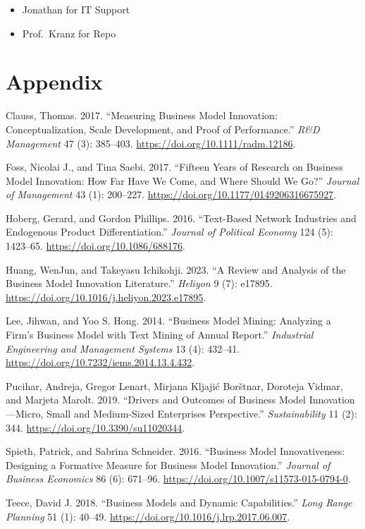 \documentclass[
]{article}
\providecommand{\tightlist}{%
  \setlength{\itemsep}{0pt}\setlength{\parskip}{0pt}}\usepackage{longtable,booktabs,array}
\newlength{\cslhangindent}
\newenvironment{CSLReferences}[2] %
 {\begin{list}{}{%
  \setlength{\itemindent}{0pt}
  \setlength{\leftmargin}{0pt}
  \setlength{\parsep}{0pt}
  \ifodd #1
   \setlength{\leftmargin}{\cslhangindent}
   \setlength{\itemindent}{-1\cslhangindent}
  \fi
  \setlength{\itemsep}{#2\baselineskip}}}
 {\end{list}}
\begin{document}
\begin{itemize}
\tightlist
\item
  Jonathan for IT Support
\item
  Prof.~Kranz for Repo
\end{itemize}

\section*{Appendix}\label{appendix}

\label{refs}
\begin{CSLReferences}{1}{0}
Clauss, Thomas. 2017. {``Measuring Business Model Innovation:
Conceptualization, Scale Development, and Proof of Performance.''}
\emph{R\&D Management} 47 (3): 385--403.
\url{https://doi.org/10.1111/radm.12186}.

Foss, Nicolai J., and Tina Saebi. 2017. {``Fifteen {Years} of {Research}
on {Business} {Model} {Innovation}: {How} {Far} {Have} {We} {Come}, and
{Where} {Should} {We} {Go}?''} \emph{Journal of Management} 43 (1):
200--227. \url{https://doi.org/10.1177/0149206316675927}.

Hoberg, Gerard, and Gordon Phillips. 2016. {``Text-{Based} {Network}
{Industries} and {Endogenous} {Product} {Differentiation}.''}
\emph{Journal of Political Economy} 124 (5): 1423--65.
\url{https://doi.org/10.1086/688176}.

Huang, WenJun, and Takeyasu Ichikohji. 2023. {``A Review and Analysis of
the Business Model Innovation Literature.''} \emph{Heliyon} 9 (7):
e17895. \url{https://doi.org/10.1016/j.heliyon.2023.e17895}.

Lee, Jihwan, and Yoo S. Hong. 2014. {``Business {Model} {Mining}:
{Analyzing} a {Firm}'s {Business} {Model} with {Text} {Mining} of
{Annual} {Report}.''} \emph{Industrial Engineering and Management
Systems} 13 (4): 432--41.
\url{https://doi.org/10.7232/iems.2014.13.4.432}.

Pucihar, Andreja, Gregor Lenart, Mirjana Kljajić Borštnar, Doroteja
Vidmar, and Marjeta Marolt. 2019. {``Drivers and {Outcomes} of
{Business} {Model} {Innovation}---{Micro}, {Small} and {Medium}-{Sized}
{Enterprises} {Perspective}.''} \emph{Sustainability} 11 (2): 344.
\url{https://doi.org/10.3390/su11020344}.

Spieth, Patrick, and Sabrina Schneider. 2016. {``Business Model
Innovativeness: Designing a Formative Measure for Business Model
Innovation.''} \emph{Journal of Business Economics} 86 (6): 671--96.
\url{https://doi.org/10.1007/s11573-015-0794-0}.

Teece, David J. 2018. {``Business Models and Dynamic Capabilities.''}
\emph{Long Range Planning} 51 (1): 40--49.
\url{https://doi.org/10.1016/j.lrp.2017.06.007}.

\end{CSLReferences}
\end{document}

